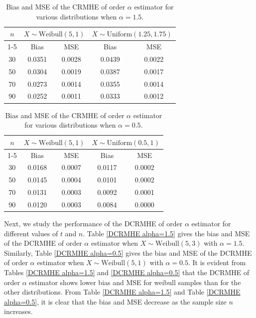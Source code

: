 \documentclass[11pt,reqno]{amsart}
\theoremstyle{tight}
\begin{document}
\begin{table}[h!]
    \centering
    \caption{Bias and MSE of the CRMHE of order $\alpha$ estimator for various distributions when $\alpha=1.5$.}
    \label{CRMHE alpha=1.5}


\begin{tabular}{|c|cc|cc|}
\toprule
$n$ & \multicolumn{2}{c|}{$X \sim \text{Weibull}(5,1)$ } &  \multicolumn{2}{c|}{$X \sim \text{Uniform}(1.25,1.75)$}  \\

\cmidrule{1-5}

& Bias & MSE & Bias & MSE \\

\midrule
30 &0.0351& 0.0028& 0.0439& 0.0022\\

50& 0.0304& 0.0019 &0.0387& 0.0017\\

70& 0.0273& 0.0014&0.0355& 0.0014\\
90 &0.0252& 0.0011&0.0333& 0.0012 \\
\bottomrule
\end{tabular}
\end{table}

\begin{table}[h!]
\centering
\caption{Bias and MSE of the CRMHE of order $\alpha$ estimator for various distributions when $\alpha=0.5$.}
    \label{CRMHE alpha=0.5}


\begin{tabular}{|c|cc|cc|}
\toprule
$n$ & \multicolumn{2}{c|}{$X \sim \text{Weibull}(5,1)$ }  &  \multicolumn{2}{c|}{$X \sim \text{Uniform}(0.5,1)$}  \\
\cmidrule{1-5}

& Bias & MSE & Bias & MSE \\
\midrule
 30& 0.0168& 0.0007& 0.0117& 0.0002\\

 50& 0.0145& 0.0004&0.0101& 0.0002\\
70& 0.0131& 0.0003& 0.0092& 0.0001 \\
 90& 0.0120& 0.0003&0.0084& 0.0000 \\
 \bottomrule
\end{tabular}
\end{table}



Next, we study the performance of the DCRMHE of order $\alpha$ estimator for different values of $t$ and $n$. Table \ref{DCRMHE alpha=1.5} gives the bias and MSE of the DCRMHE of order $\alpha$ estimator when $X \sim \text{Weibull}(5,3)$  with $\alpha=1.5$. Similarly, Table \ref{DCRMHE alpha=0.5} gives the bias and MSE of the DCRMHE of order $\alpha$ estimator when $X \sim \text{Weibull}(5,1)$ with $\alpha=0.5$. It is evident from Tables \ref{DCRMHE alpha=1.5} and \ref{DCRMHE alpha=0.5} that the DCRMHE of order $\alpha$ estimator shows lower bias and MSE for weibull samples than for the other distributions. From Table \ref{DCRMHE alpha=1.5} and Table \ref{DCRMHE alpha=0.5}, it is clear that the bias and MSE decrease as the sample size $n$ increases.
\end{document}

